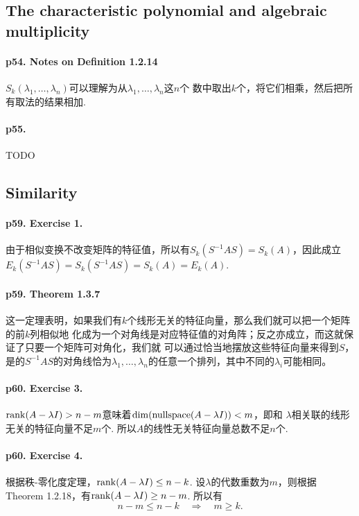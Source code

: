 \subsection{The characteristic polynomial and algebraic multiplicity}
  \paragraph{p54. Notes on Definition 1.2.14}
    $S_k(\lambda_1,\dots,\lambda_n)$可以理解为从$\lambda_1,\dots,\lambda_n$这$n$个
    数中取出$k$个，将它们相乘，然后把所有取法的结果相加. 
  \paragraph{p55. } TODO
\subsection{Similarity}
  \paragraph{p59. Exercise 1.}
    由于相似变换不改变矩阵的特征值，所以有$S_k(S^{-1}AS)=S_k(A)$，因此成立$E_k(S^{-1}A
    S)=S_{k}(S^{-1}AS)=S_k(A)=E_k(A)$. 

  \paragraph{p59. Theorem 1.3.7}
    这一定理表明，如果我们有$k$个线形无关的特征向量，那么我们就可以把一个矩阵的前$k$列相似地
    化成为一个对角线是对应特征值的对角阵；反之亦成立，而这就保证了只要一个矩阵可对角化，我们就
    可以通过恰当地摆放这些特征向量来得到$S$，是的$S^{-1}AS$的对角线恰为$\lambda_1,\dots,
    \lambda_n$的任意一个排列，其中不同的$\lambda_i$可能相同。


  \paragraph{p60. Exercise 3.}
    $\operatorname{rank}(A-\lambda I)>n-m$意味着$\dim(\operatorname{nullspace} (A-\lambda I)) < m$，即和
    $\lambda$相关联的线形无关的特征向量不足$m$个. 所以$A$的线性无关特征向量总数不足$n$个. 

  \paragraph{p60. Exercise 4.}
    根据秩-零化度定理，$\operatorname{rank}(A-\lambda I)\le n-k$. 设$\lambda$的代数重数为$m$，则根据
    Theorem 1.2.18，有$\operatorname{rank}(A-\lambda I)\ge n-m$. 所以有
    \[
      n-m \le n-k \quad\Rightarrow\quad m\ge k.
    \]

